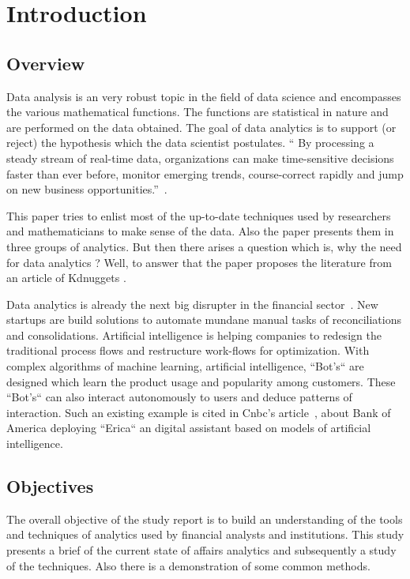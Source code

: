 \setlength{\footskip}{8mm}

\chapter{Introduction}

\section{Overview}

Data analysis is an very robust topic in the field of data science and encompasses the various mathematical functions. The functions are statistical in nature and are performed on the data obtained. The goal of data analytics is to support (or reject) the hypothesis which the data scientist postulates.
“ By processing a steady stream of real-time data, organizations can make time-sensitive decisions faster than ever before, monitor emerging trends, course-correct rapidly and jump on new business opportunities.”~.

This paper tries to enlist most of the up-to-date techniques used by researchers and mathematicians to make sense of the data. Also the paper presents them in three groups of analytics.
But then there arises a question which is, why the need for data analytics ? Well, to answer that the paper proposes the literature from an article of Kdnuggets .

Data analytics is already the next big disrupter in the financial sector~. New startups are build solutions to automate mundane manual tasks of reconciliations and consolidations. Artificial intelligence is helping companies to redesign the traditional process flows and restructure work-flows for optimization. With complex algorithms of machine learning, artificial intelligence, ``Bot's`` are designed which learn the product usage and popularity among customers. These ``Bot's`` can also interact autonomously to users and deduce patterns of interaction.
Such an existing example is cited in Cnbc's article~, about Bank of America deploying ``Erica`` an digital assistant based on models of artificial intelligence.


\section{Objectives}

The overall objective of the study report is to build an understanding of the tools and techniques of analytics used by financial analysts and institutions. This study presents a brief of the current state of affairs analytics and subsequently a study of the techniques. Also there is a demonstration of some common methods.

